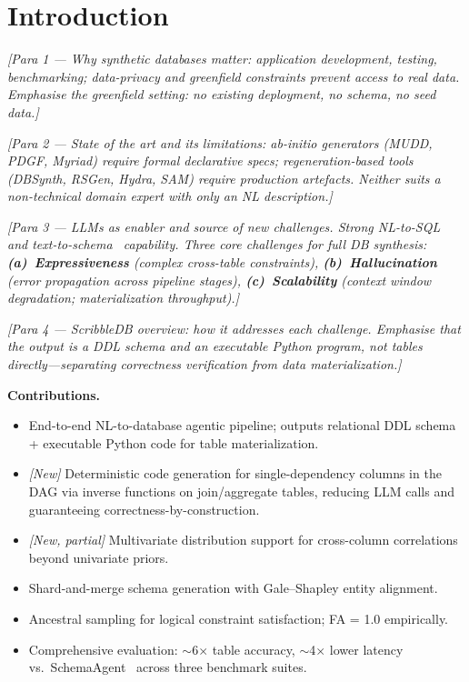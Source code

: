 \section{Introduction}

\textit{[Para 1 --- Why synthetic databases matter: application development, testing,
benchmarking; data-privacy and greenfield constraints prevent access to real data.
Emphasise the greenfield setting: no existing deployment, no schema, no seed data.]}

\textit{[Para 2 --- State of the art and its limitations:
ab-initio generators (MUDD, PDGF, Myriad) require formal declarative specs;
regeneration-based tools (DBSynth, RSGen, Hydra, SAM) require production artefacts.
Neither suits a non-technical domain expert with only an NL description.]}

\textit{[Para 3 --- LLMs as enabler and source of new challenges.
Strong NL-to-SQL~\cite{yu2019spider} and text-to-schema~\cite{wang2025text2schema} capability.
Three core challenges for full DB synthesis:
\textbf{(a)~Expressiveness} (complex cross-table constraints),
\textbf{(b)~Hallucination} (error propagation across pipeline stages),
\textbf{(c)~Scalability} (context window degradation; materialization throughput).]}

\textit{[Para 4 --- ScribbleDB overview: how it addresses each challenge.
Emphasise that the \emph{output} is a DDL schema and an executable Python program, not
tables directly---separating correctness verification from data materialization.]}

\medskip\noindent\textbf{Contributions.}
\begin{itemize}[leftmargin=*]
  \item End-to-end NL-to-database agentic pipeline; outputs relational DDL schema
        + executable Python code for table materialization.
  \item \textit{[New]} Deterministic code generation for single-dependency columns
        in the DAG via inverse functions on join/aggregate tables,
        reducing LLM calls and guaranteeing correctness-by-construction.
  \item \textit{[New, partial]} Multivariate distribution support for cross-column
        correlations beyond univariate priors.
  \item Shard-and-merge schema generation with Gale--Shapley entity alignment.
  \item Ancestral sampling for logical constraint satisfaction; FA = 1.0 empirically.
  \item Comprehensive evaluation: $\sim$6$\times$ table accuracy, $\sim$4$\times$ lower
        latency vs.\ SchemaAgent~\cite{wang2025text2schema} across three benchmark suites.
\end{itemize}

